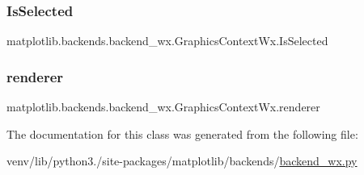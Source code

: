 \subsubsection{\texorpdfstring{Is\+Selected}{IsSelected}}
{\footnotesize\ttfamily matplotlib.\+backends.\+backend\+\_\+wx.\+Graphics\+Context\+Wx.\+Is\+Selected}

\mbox{\label{classmatplotlib_1_1backends_1_1backend__wx_1_1GraphicsContextWx_a88d17992a26fec774d73446719e7d44e}} 
\subsubsection{\texorpdfstring{renderer}{renderer}}
{\footnotesize\ttfamily matplotlib.\+backends.\+backend\+\_\+wx.\+Graphics\+Context\+Wx.\+renderer}



The documentation for this class was generated from the following file\+:\begin{DoxyCompactItemize}
\item 
venv/lib/python3./site-\/packages/matplotlib/backends/\hyperlink{backend__wx_8py}{backend\+\_\+wx.\+py}\end{DoxyCompactItemize}
